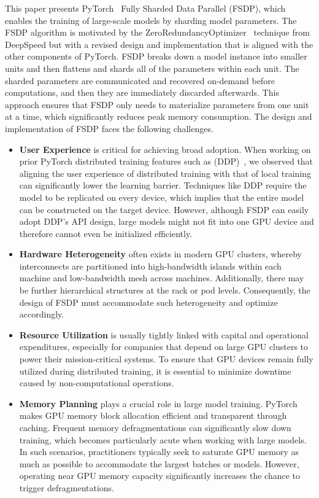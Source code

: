 This paper presents PyTorch~\cite{pytorch:nips:2019} Fully Sharded Data Parallel (FSDP), which enables the training of large-scale models by sharding model parameters. The FSDP algorithm is motivated by the ZeroRedundancyOptimizer~\cite{zero, zero:offload} technique from DeepSpeed but with a revised design and implementation that is aligned with the other components of PyTorch. FSDP breaks down a model instance into smaller units and then flattens and shards all of the parameters within each unit. The sharded parameters are communicated and recovered on-demand before computations, and then they are immediately discarded afterwards. This approach ensures that FSDP only needs to materialize parameters from one unit at a time, which significantly reduces peak memory consumption. The design and implementation of FSDP faces the following challenges.

\begin{itemize}
    \item \textbf{User Experience} is critical for achieving broad adoption. When working on prior PyTorch distributed training features such as  (DDP)~\cite{ddp}, we observed that aligning the user experience of distributed training with that of local training can significantly lower the learning barrier. Techniques like DDP require the model to be replicated on every device, which implies that the entire model can be constructed on the target device. However, although FSDP can easily adopt DDP's API design, large models might not fit into one GPU device and therefore cannot even be initialized efficiently. 
    \item \textbf{Hardware Heterogeneity} often exists in modern GPU clusters, whereby interconnects are partitioned into high-bandwidth islands within each machine and low-bandwidth mesh across machines. Additionally, there may be further hierarchical structures at the rack or pod levels. Consequently, the design of FSDP must accommodate such heterogeneity and optimize accordingly. 
    \item \textbf{Resource Utilization} is usually tightly linked with capital and operational expenditures, especially for companies that depend on large GPU clusters to power their mission-critical systems. To ensure that GPU devices remain fully utilized during distributed training, it is essential to minimize downtime caused by non-computational operations.
    \item \textbf{Memory Planning} plays a crucial role in large model training. PyTorch makes GPU memory block allocation efficient and transparent through caching. Frequent memory defragmentations can significantly slow down training, which becomes particularly acute when working with large models. In such scenarios, practitioners typically seek to saturate GPU memory as much as possible to accommodate the largest batches or models. However, operating near GPU memory capacity significantly increases the chance to trigger defragmentations.
\end{itemize}

